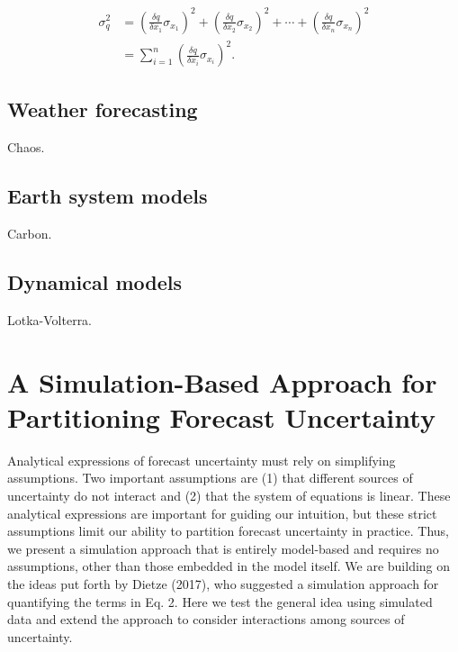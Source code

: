 \documentclass[12pt,]{article}
\begin{document}
\begin{align}
\sigma^2_q &= \left( \frac{\delta q}{\delta x_1} \sigma_{x_1} \right)^2 + \left( \frac{\delta q}{\delta x_2} \sigma_{x_2} \right)^2 + \cdots + \left( \frac{\delta q}{\delta x_n} \sigma_{x_n} \right)^2 \\
&= \sum^n_{i=1}\left( \frac{\delta q}{\delta x_i} \sigma_{x_i} \right)^2.
\end{align}

\hypertarget{weather-forecasting}{%
\subsection{Weather forecasting}\label{weather-forecasting}}

Chaos.

\hypertarget{earth-system-models}{%
\subsection{Earth system models}\label{earth-system-models}}

Carbon.

\hypertarget{dynamical-models}{%
\subsection{Dynamical models}\label{dynamical-models}}

Lotka-Volterra.

\hypertarget{a-simulation-based-approach-for-partitioning-forecast-uncertainty}{%
\section{A Simulation-Based Approach for Partitioning Forecast
Uncertainty}\label{a-simulation-based-approach-for-partitioning-forecast-uncertainty}}

Analytical expressions of forecast uncertainty must rely on simplifying
assumptions. Two important assumptions are (1) that different sources of
uncertainty do not interact and (2) that the system of equations is
linear. These analytical expressions are important for guiding our
intuition, but these strict assumptions limit our ability to partition
forecast uncertainty in practice. Thus, we present a simulation approach
that is entirely model-based and requires no assumptions, other than
those embedded in the model itself. We are building on the ideas put
forth by Dietze (2017), who suggested a simulation approach for
quantifying the terms in Eq. 2. Here we test the general idea using
simulated data and extend the approach to consider interactions among
sources of uncertainty.
\end{document}
